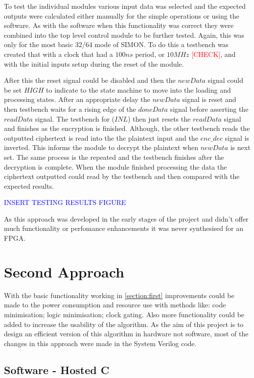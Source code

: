 \documentclass[12pt,twoside,a4paper]{report}
\begin{document}
	To test the individual modules various input data was selected and the expected outputs were calculated either manually for the simple operations or using the software. As with the software when this functionality was correct they were combined into the top level control module to be further tested. Again, this was only for the most basic 32/64 mode of SIMON. To do this a testbench was created that with a clock that had a $100ns$ period, or $10MHz$ \textcolor{red}{[CHECK]}, and with the initial inputs setup during the reset of the module. 
	
	After this the reset signal could be disabled and then the $newData$ signal could be set $HIGH$ to indicate to the state machine to move into the loading and processing states. After an appropriate delay the $newData$ signal is reset and then testbench waits for a rising edge of the $doneData$ signal before asserting the $readData$ signal. The testbench for ($INL$) then just resets the $readData$ signal and finishes as the encryption is finished. Although, the other testbench reads the outputted ciphertext is read into the the plaintext input and the $enc\_dec$ signal is inverted. This informs the module to decrypt the plaintext when $newData$ is next set. The same process is the repeated and the testbench finishes after the decryption is complete. When the module finished processing the data the ciphertext outputted could read by the testbench and then compared with the expected results.
	
	\textcolor{blue}{INSERT TESTING RESULTS FIGURE}
	
	As this approach was developed in the early stages of the project and didn't offer much functionality or perfomance enhancements it was never synthesised for an FPGA.
    
	\section{Second Approach}
	\label{section:second}
	With the basic functionality working in \autoref{section:first} improvements could be made to the power consumption and resource use with methods like: code minimisation; logic minimisation; clock gating. Also more functionality could be added to increase the usability of the algorithm. As the aim of this project is to design an efficient version of this algorithm in hardware not software, most of the changes in this approach were made in the System Verilog code.
    
	\subsection{Software - Hosted C}
	\label{subsection:HOSTED2}
	
\end{document}
